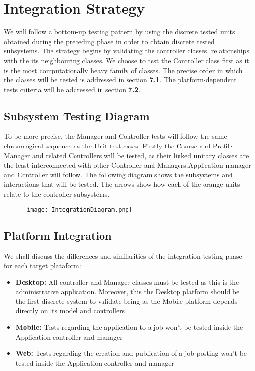 \documentclass[12pt]{report}
\begin{document}
\section{Integration Strategy}

We will follow a bottom-up testing pattern by using the discrete tested units obtained during the preceding phase in order to obtain discrete tested subsystems. The strategy begins by validating the controller classes' relationships with the its neighbouring classes. We choose to test the Controller class first as it is the most computationally heavy family of classes. The precise order in which the classes will be tested is addressed in section \textbf{7.1}. The platform-dependent tests criteria will be addressed in section \textbf{7.2}.
 \subsection{Subsystem Testing Diagram}
    To be more precise, the Manager and Controller tests will follow the same chronological sequence as the Unit test cases. Firstly the Course and Profile Manager and related Controllers will be tested, as their linked unitary classes are the least interconnected with other Controller and Managers.Application manager and Controller will follow.  
	The following diagram shows the subsystems and interactions that will be tested. The arrows show
	how each of the orange units relate to the controller subsystems. 
 \begin{figure}[H]
    \centering
    \texttt{[image: IntegrationDiagram.png]}
 \end{figure}
 \subsection{Platform Integration}

We shall discuss the differences and similarities of the integration testing phase for each target plataform:
\begin{itemize}
    \item \textbf{Desktop:} All controller and Manager classes must be tested as this is the administrative application. Moreover, this the Desktop platform should be the first discrete system to validate being as the Mobile platform depends directly on its model and controllers
    \item \textbf{Mobile:} Tests regarding the application to a job won't be tested inside the Application controller and manager
    \item \textbf{Web:} Tests regarding the creation and publication of a job posting won't be tested inside the Application controller and manager
\end{itemize}
 
\end{document}
